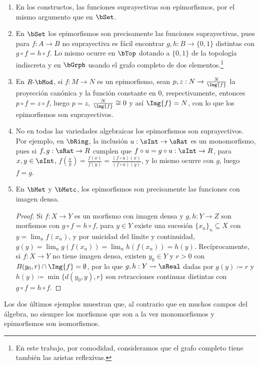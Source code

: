 \begin{example}\;
  \begin{enumerate}
  \item En los constructos, las funciones suprayectivas son epimorfismos, por el
    mismo argumento que en $\bSet$.
  \item En $\bSet$ los epimorfismos son precisamente las funciones
    suprayectivas, pues para $f:A\to B$ no suprayectiva es fácil encontrar
    $g,h:B\to\{0,1\}$ distintas con $g\circ f=h\circ f$. Lo mismo ocurre en
    $\bTop$ dotando a $\{0,1\}$ de la topología indiscreta y en $\bGrph$ usando
    el grafo completo de dos elementos.\footnote{En este trabajo, por comodidad,
      consideramos que el grafo completo tiene también las aristas reflexivas.}
  \item En $R\dash\bMod$, si $f:M\to N$ es un epimorfismo, sean
    $p,z:N\to\frac{N}{\Img{f}}$ la proyección canónica y la función constante en
    0, respectivamente, entonces $p\circ f=z\circ f$, luego $p=z$,
    $\frac{N}{\Img{f}}\cong0$ y así $\Img{f}=N$, con lo que los epimorfismos son
    suprayectivos.
  \item No en todas las variedades algebraicas los epimorfismos son
    suprayectivos. Por ejemplo, en $\bRing$, la inclusión $u:\sInt\to\sRat$ es
    un monomorfismo, pues si $f,g:\sRat\to R$ cumplen que
    $f\circ u=g\circ u:\sInt\to R$, para $x,y\in\sInt$,
    $f(\frac xy)=\frac{f(x)}{f(y)}=\frac{(f\circ u)(x)}{(f\circ u)(y)}$, y lo
    mismo ocurre con $g$, luego $f=g$.
  \item En $\bMet$ y $\bMetc$, los epimorfismos son precisamente las funciones
    con imagen densa.
    \begin{proof}
      Si $f:X\to Y$ es un morfismo con imagen densa y $g,h:Y\to Z$ son morfismos
      con $g\circ f=h\circ f$, para $y\in Y$ existe una sucesión
      $\{x_n\}_n\subseteq X$ con $y=\lim_nf(x_n)$, y por unicidad del límite y
      continuidad, $g(y)=\lim_ng(f(x_n))=\lim_nh(f(x_n))=h(y)$.  Recíprocamente,
      si $f:X\to Y$ no tiene imagen densa, existen $y_0\in Y$ y $r>0$ con
      $B(y_0,r)\cap\Img{f}=\emptyset$, por lo que $g,h:Y\mapsto\sReal$ dadas por
      $g(y)\coloneqq r$ y $h(y)\coloneqq\min\{d(y_0,y),r\}$ son retracciones
      continuas distintas con $g\circ f=h\circ f$.
    \end{proof}
  \end{enumerate}
\end{example}

Los dos últimos ejemplos muestran que, al contrario que en muchos campos del
álgebra, no siempre los morfismos que son a la vez monomorfismos y epimorfismos
son isomorfismos.

